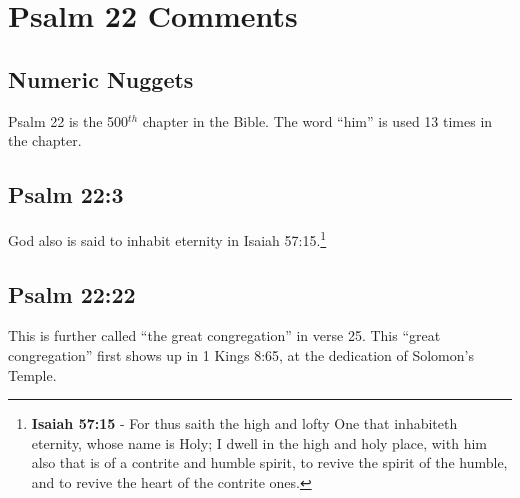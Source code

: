 \section{Psalm 22 Comments}

\subsection{Numeric Nuggets}
Psalm 22 is the 500$^{th}$ chapter in the Bible. The word ``him'' is used 13 times in the chapter.

\subsection{Psalm 22:3}
God also is said to inhabit eternity in Isaiah 57:15.\footnote{\textbf{Isaiah 57:15} - For thus saith the high and lofty One that inhabiteth eternity, whose name is Holy; I dwell in the high and holy place, with him also that is of a contrite and humble spirit, to revive the spirit of the humble, and to revive the heart of the contrite ones.}

\subsection{Psalm 22:22}
This is further called ``the great congregation'' in verse 25. This ``great congregation'' first shows up in 1 Kings 8:65, at the dedication of Solomon's Temple.

